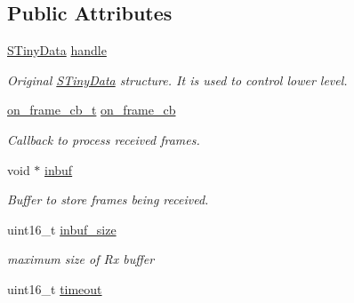 \subsection*{Public Attributes}
\begin{DoxyCompactItemize}
\item 
\mbox{\label{structSTinyHdData___a0df5a323cbbfd49fb138b14bca73f14c}} 
\hyperlink{structSTinyData}{S\+Tiny\+Data} \hyperlink{structSTinyHdData___a0df5a323cbbfd49fb138b14bca73f14c}{handle}
\begin{DoxyCompactList}\small\item\em Original \hyperlink{structSTinyData}{S\+Tiny\+Data} structure. It is used to control lower level. \end{DoxyCompactList}\item 
\mbox{\label{structSTinyHdData___abf8a0eb5006769a92adc186554a3a1c0}} 
\hyperlink{tiny__proto__types_8h_ad6bf709565b8aecb9e6ecf196f219d54}{on\+\_\+frame\+\_\+cb\+\_\+t} \hyperlink{structSTinyHdData___abf8a0eb5006769a92adc186554a3a1c0}{on\+\_\+frame\+\_\+cb}
\begin{DoxyCompactList}\small\item\em Callback to process received frames. \end{DoxyCompactList}\item 
\mbox{\label{structSTinyHdData___a69a6bb34b580bcfa5e13112cb7652d1d}} 
void $\ast$ \hyperlink{structSTinyHdData___a69a6bb34b580bcfa5e13112cb7652d1d}{inbuf}
\begin{DoxyCompactList}\small\item\em Buffer to store frames being received. \end{DoxyCompactList}\item 
\mbox{\label{structSTinyHdData___adbad190a4b54eccd4da6f3c3305a54f1}} 
uint16\+\_\+t \hyperlink{structSTinyHdData___adbad190a4b54eccd4da6f3c3305a54f1}{inbuf\+\_\+size}
\begin{DoxyCompactList}\small\item\em maximum size of Rx buffer \end{DoxyCompactList}\item 
\mbox{\label{structSTinyHdData___a7ca4e5b23cf480d93317245010bcbe73}} 
uint16\+\_\+t \hyperlink{structSTinyHdData___a7ca4e5b23cf480d93317245010bcbe73}{timeout}

\end{DoxyCompactItemize}
